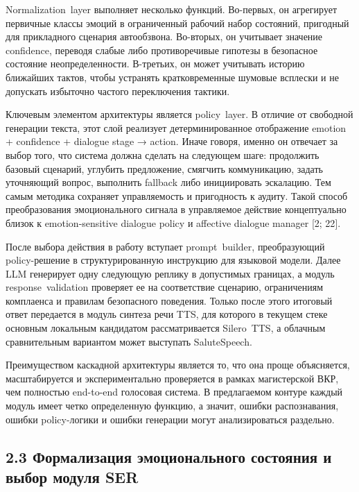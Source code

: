 \documentclass[a4paper,14pt]{extarticle}
\renewcommand{\texttt}[1]{\textnormal{#1}}
\begin{document}
\texttt{Normalization\ layer} выполняет несколько функций. Во-первых, он
агрегирует первичные классы эмоций в ограниченный рабочий набор
состояний, пригодный для прикладного сценария автообзвона. Во-вторых, он
учитывает значение \texttt{confidence}, переводя слабые либо
противоречивые гипотезы в безопасное состояние неопределенности.
В-третьих, он может учитывать историю ближайших тактов, чтобы устранять
кратковременные шумовые всплески и не допускать избыточно частого
переключения тактики.

Ключевым элементом архитектуры является \texttt{policy\ layer}. В
отличие от свободной генерации текста, этот слой реализует
детерминированное отображение emotion + confidence + dialogue stage →
action. Иначе говоря, именно он отвечает за выбор того, что система
должна сделать на следующем шаге: продолжить базовый сценарий, углубить
предложение, смягчить коммуникацию, задать уточняющий вопрос, выполнить
fallback либо инициировать эскалацию. Тем самым методика сохраняет
управляемость и пригодность к аудиту. Такой способ преобразования
эмоционального сигнала в управляемое действие концептуально близок к
emotion-sensitive dialogue policy и affective dialogue manager {[}2;
22{]}.

После выбора действия в работу вступает \texttt{prompt\ builder},
преобразующий policy-решение в структурированную инструкцию для языковой
модели. Далее \texttt{LLM} генерирует одну следующую реплику в
допустимых границах, а модуль \texttt{response\ validation} проверяет ее
на соответствие сценарию, ограничениям комплаенса и правилам безопасного
поведения. Только после этого итоговый ответ передается в модуль синтеза
речи \texttt{TTS}, для которого в текущем стеке основным локальным
кандидатом рассматривается \texttt{Silero\ TTS}, а облачным
сравнительным вариантом может выступать \texttt{SaluteSpeech}.

Преимуществом каскадной архитектуры является то, что она проще
объясняется, масштабируется и экспериментально проверяется в рамках
магистерской ВКР, чем полностью end-to-end голосовая система. В
предлагаемом контуре каждый модуль имеет четко определенную функцию, а
значит, ошибки распознавания, ошибки policy-логики и ошибки генерации
могут анализироваться раздельно.

\subsection{2.3 Формализация эмоционального состояния и выбор модуля
SER}\label{ux444ux43eux440ux43cux430ux43bux438ux437ux430ux446ux438ux44f-ux44dux43cux43eux446ux438ux43eux43dux430ux43bux44cux43dux43eux433ux43e-ux441ux43eux441ux442ux43eux44fux43dux438ux44f-ux438-ux432ux44bux431ux43eux440-ux43cux43eux434ux443ux43bux44f-ser}
\end{document}
